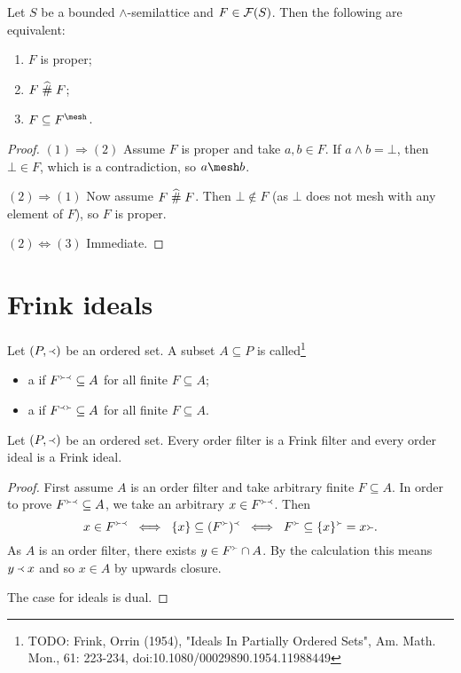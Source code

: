 \begin{lemma} \label{properFiltersSelfMesh}
Let $S$ be a bounded $\wedge$-semilattice and $F\in\operatorname{\mathcal{F}}(S)$. Then the following are equivalent:
\begin{enumerate}
\item $F$ is proper;
\item $F\mathrel{\widehat{\#}} F$;
\item $F\subseteq F^\mesh$.
\end{enumerate}
\end{lemma}
\begin{proof}
$(1)\Rightarrow (2)$ Assume $F$ is proper and take $a, b\in F$. If $a\wedge b = \bot$, then $\bot\in F$, which is a contradiction, so $a\mesh b$.

$(2) \Rightarrow (1)$ Now assume $F \mathrel{\widehat{\#}} F$. Then $\bot \notin F$ (as $\bot$ does not mesh with any element of $F$), so $F$ is proper.

$(2) \Leftrightarrow (3)$ Immediate.
\end{proof}



\section{Frink ideals}
\begin{definition}
Let $\sSet{P,\Yleft}$ be an ordered set. A subset $A\subseteq P$ is called\footnote{TODO: Frink, Orrin (1954), "Ideals In Partially Ordered Sets", Am. Math. Mon., 61: 223-234, doi:10.1080/00029890.1954.11988449}
\begin{itemize}
\item a  if $F^{\Yright\Yleft} \subseteq A$ for all finite $F\subseteq A$;
\item a  if $F^{\Yleft\Yright} \subseteq A$ for all finite $F\subseteq A$.
\end{itemize}
\end{definition}

\begin{proposition}
Let $\sSet{P,\Yleft}$ be an ordered set. Every order filter is a Frink filter and every order ideal is a Frink ideal.
\end{proposition}
\begin{proof}
First assume $A$ is an order filter and take arbitrary finite $F\subseteq A$. In order to prove $F^{\Yright\Yleft} \subseteq A$, we take an arbitrary $x\in F^{\Yright\Yleft}$. Then
\[ x\in F^{\Yright\Yleft} \;\iff\; \{x\}\subseteq (F^\Yright)^\Yleft \;\iff\; F^\Yright \subseteq \{x\}^\Yright = x{\Yright}. \]
As $A$ is an order filter, there exists $y\in F^\Yright \cap A$. By the calculation this means $y\Yleft x$ and so $x\in A$ by upwards closure.

The case for ideals is dual.
\end{proof}


